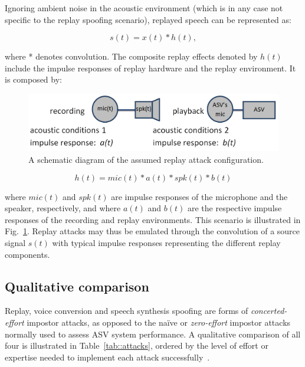 Ignoring ambient noise in the acoustic environment (which is in any case not specific to the replay spoofing scenario), replayed speech can be represented as:


\begin{equation}
s(t) = x(t)*h(t),
\label{eq:replay}
\end{equation}


\noindent where * denotes convolution.  The composite replay effects denoted by $h(t)$ include the impulse responses of replay hardware and the replay environment.  It is composed by:


\begin{figure}
	\includegraphics[width=1\linewidth]{Figs/replay.png}
	\caption{A schematic diagram of the assumed replay attack configuration. %
}
	\label{fig::Replay}
\end{figure}

\begin{equation}
h(t) = mic(t) * a(t) * spk(t) * b(t)
\label{eq::playback}
\end{equation}


\noindent where $mic(t)$ and $spk(t)$ are impulse responses of the microphone and the speaker, respectively, and where $a(t)$ and $b(t)$ are the respective impulse responses of the recording and replay environments.  This scenario is illustrated in Fig.~\ref{fig::Replay}.  Replay attacks may thus be emulated through the convolution of a source signal $s(t)$ with typical impulse responses representing the different replay components.



\subsection{Qualitative comparison}
\label{sec::algorithms::comparison}

Replay, voice conversion and speech synthesis spoofing are forms of \emph{concerted-effort} impostor attacks, as opposed to the na\"{i}ve or \emph{zero-effort} impostor attacks normally used to assess ASV system performance.  A qualitative comparison of all four is illustrated in Table~\ref{tab::attacks}, ordered by the level of effort or expertise needed to implement each attack successfully~\cite{Wu2014a}. 

